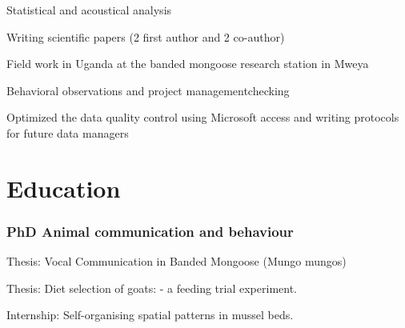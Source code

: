 \documentclass[letterpaper]{deedy-resume} %
\begin{document}
\begin{minipage}[t]{0.66\textwidth}
\sectionspace %

\begin{tightitemize}
\item Statistical and acoustical analysis
\item Writing scientific papers (2 first author and 2 co-author)
\item Field work in Uganda at the banded mongoose research station in Mweya
\end{tightitemize}
\sectionspace %

\begin{tightitemize}
\item Behavioral observations and project managementchecking
\item Optimized the data quality control using Microsoft access and writing protocols for future data managers
\end{tightitemize}

\sectionspace %

\section{Education}

\subsubsection*{PhD Animal communication and behaviour}
\vspace{\topsep} %
\begin{tightitemize}
\item Thesis: Vocal Communication in Banded Mongoose (Mungo mungos)
\end{tightitemize}

\sectionspace %

\vspace{\topsep} %
\begin{tightitemize}
\item Thesis: Diet selection of goats: - a feeding trial experiment.
\item Internship: Self-organising spatial patterns in mussel beds.
\end{tightitemize}
\sectionspace %


\end{minipage}
\end{document}
